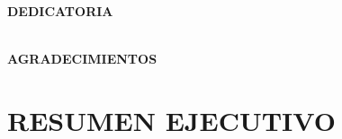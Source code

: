\documentclass[12pt,a4paper,oneside]{book}
\begin{document}
\newpage
\newpage
$\ $
\thispagestyle{empty} %





\begin{titlepage}

\begin{flushright}
{\large \bf DEDICATORIA}
\\
\textit{}
\\
\textit{} %
\end{flushright}
\end{titlepage}


\begin{titlepage}

\begin{flushright}
{\large \bf AGRADECIMIENTOS}
\\
\textit{}
{} %
\end{flushright}
\end{titlepage}


\tableofcontents
\cleardoublepage
\listoftables
\listoffigures 
\newpage


\chapter*{\centering \large RESUMEN EJECUTIVO} %
\doublespacing
\end{document}
